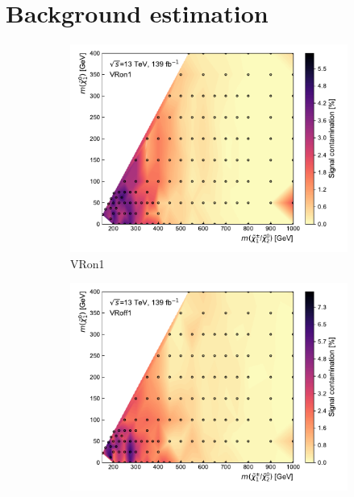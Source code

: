 
\ifpdf
\graphicspath{{chapter-background/Figs/Raster/}{chapter-background/Figs/PDF/}{chapter-background/Figs/}}
\else
\graphicspath{{chapter-background/Figs/Vector/}{chapter-background/Figs/}}
\fi

\section{Background estimation}\label{app:background_estimation}
\begin{figure}[H]
	\centering
	\begin{subfigure}[b]{0.5\linewidth}
		\centering\includegraphics[width=1.0\textwidth]{signal_contamination/plot_VRon1}
		\caption{VRon1\label{fig:signal_contamination_VRon1}}
	\end{subfigure}\hfill
	\begin{subfigure}[b]{0.5\linewidth}
		\centering\includegraphics[width=1.0\textwidth]{signal_contamination/plot_VRoff1}

\end{subfigure}
\end{figure}
